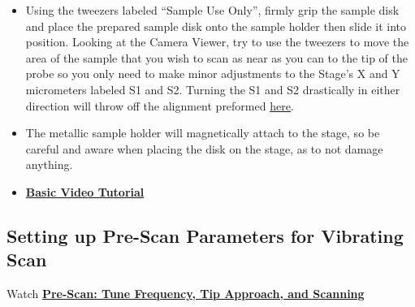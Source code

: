 \documentclass{../lab}
\begin{document}
\begin{itemize}
    \item Using the tweezers labeled ``Sample Use Only'', firmly grip the sample disk and place the prepared sample disk onto the sample holder then slide it into position.  Looking at the Camera Viewer, try to use the tweezers to move the area of the sample that you wish to scan as near as you can to the tip of the probe so you only need to make minor adjustments to the Stage's X and Y micrometers labeled S1 and S2.  Turning the S1 and S2 drastically in either direction will throw off the alignment preformed \hyperref[sec:Alignment]{here}.
    
    \item The metallic sample holder will magnetically attach to the stage, so be careful and aware when placing the disk on the stage, as to not damage anything.

    \item \href{http://experimentationlab.berkeley.edu/sites/default/files/AFMImages/3.0\%20Sample\%20Exchange\%28V1.0\%29.wmv}{\textbf{Basic Video Tutorial}}
\end{itemize}

\subsection{Setting up Pre-Scan Parameters for Vibrating Scan}
\label{subsec:SettingUpPreScanParametersForVibratingScan}

Watch \href{http://experimentationlab.berkeley.edu/sites/default/files/prescan\_final2.mp4}{\textbf{Pre-Scan: Tune Frequency, Tip Approach, and Scanning}}
\end{document}
